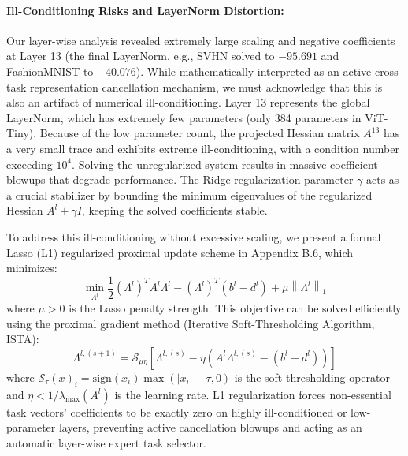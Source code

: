 \paragraph{Ill-Conditioning Risks and LayerNorm Distortion:}
Our layer-wise analysis revealed extremely large scaling and negative coefficients at Layer 13 (the final LayerNorm, e.g., SVHN solved to $-95.691$ and FashionMNIST to $-40.076$). While mathematically interpreted as an active cross-task representation cancellation mechanism, we must acknowledge that this is also an artifact of numerical ill-conditioning. Layer 13 represents the global LayerNorm, which has extremely few parameters (only 384 parameters in ViT-Tiny). Because of the low parameter count, the projected Hessian matrix $A^{13}$ has a very small trace and exhibits extreme ill-conditioning, with a condition number exceeding $10^4$. Solving the unregularized system results in massive coefficient blowups that degrade performance. The Ridge regularization parameter $\gamma$ acts as a crucial stabilizer by bounding the minimum eigenvalues of the regularized Hessian $A^l + \gamma I$, keeping the solved coefficients stable. 

To address this ill-conditioning without excessive scaling, we present a formal Lasso (L1) regularized proximal update scheme in Appendix B.6, which minimizes:
\begin{equation}
    \min_{\Lambda^l} \frac{1}{2} (\Lambda^l)^T A^l \Lambda^l - (\Lambda^l)^T (b^l - d^l) + \mu \left\| \Lambda^l \right\|_1
\label{eq:main_l1_obj}
\end{equation}
where $\mu > 0$ is the Lasso penalty strength. This objective can be solved efficiently using the proximal gradient method (Iterative Soft-Thresholding Algorithm, ISTA):
\begin{equation}
    \Lambda^{l,(s+1)} = \mathcal{S}_{\mu \eta} \left[ \Lambda^{l,(s)} - \eta \left( A^l \Lambda^{l,(s)} - (b^l - d^l) \right) \right]
\label{eq:main_ista}
\end{equation}
where $\mathcal{S}_{\tau}(x)_i = \text{sign}(x_i) \max\left( |x_i| - \tau, 0 \right)$ is the soft-thresholding operator and $\eta < 1 / \lambda_{\max}(A^l)$ is the learning rate. L1 regularization forces non-essential task vectors' coefficients to be exactly zero on highly ill-conditioned or low-parameter layers, preventing active cancellation blowups and acting as an automatic layer-wise expert task selector.

